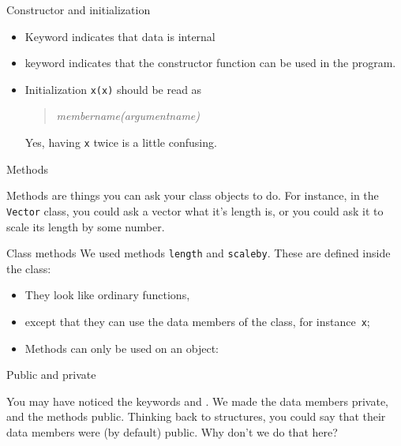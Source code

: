 \begin{block}{Constructor and initialization}
  \begin{itemize}
  \item Keyword  indicates that data is internal
  \item keyword  indicates that the constructor
    function can be used in the program.
  \item Initialization \lstinline{x(x)} should be read as
    \begin{quotation}
      \hbox{\sl membername(argumentname)}
    \end{quotation}
    Yes, having \lstinline{x} twice is a little confusing.
  \end{itemize}
\end{block}

\begin{comment}
  Above you had a declaration \lstinline{Vector v} which was not just a
  declaration: it called the so-called \indextermsub{default}{constructor},
  which has no arguments, and does nothing.
\end{comment}

 {Methods}

Methods are things you can ask your class objects to do. For instance,
in the \lstinline{Vector} class, you could ask a vector what it's length is,
or you could ask it to scale its length by some number.

\begin{block}{Class methods}
  \label{sl:method-define}
  We used methods \lstinline{length} and \lstinline{scaleby}. These are defined inside the
  class:
  \begin{itemize}
  \item They look like ordinary functions,
  \item except that they can use the data members of the class, for
    instance~\lstinline{x};
  \item Methods can only be used on an object:
  \end{itemize}
\end{block}

 {Public and private}

You may have noticed the keywords  and
. We made the data members private, and the
methods public. Thinking back to structures, you could say that their
data members were (by default) public. Why don't we do that here?

